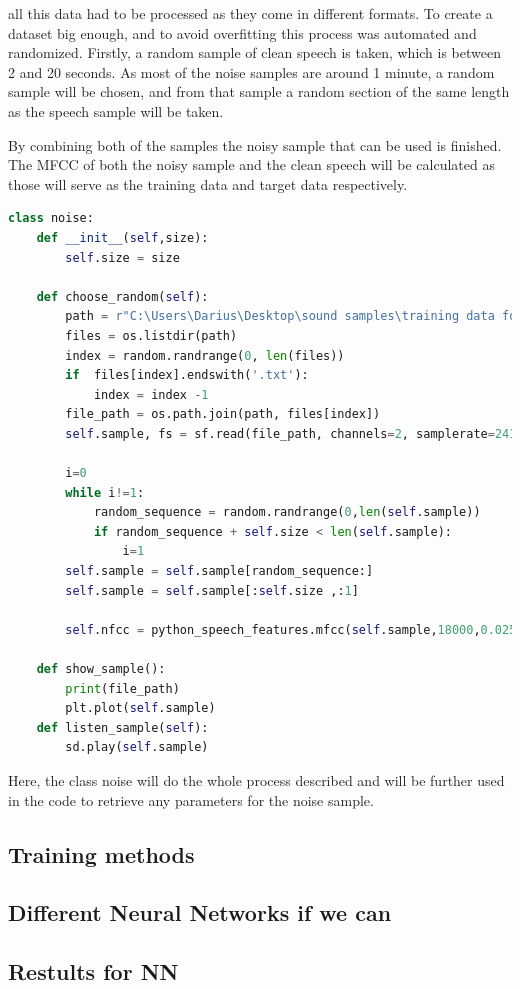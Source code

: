 all this data had to be processed as they come in different formats.
To create a dataset big enough, and to avoid overfitting this process was automated and randomized. Firstly, a random sample of clean speech is taken, which is between 2 and 20 seconds. As most of the noise samples are around 1 minute, a random sample will be chosen, and from that sample a random section of the same length as the speech sample will be taken.

By combining both of the samples the noisy sample that can be used is finished.
The MFCC of both the noisy sample and the clean speech will be calculated as those will serve as the training data and target data respectively.

\begin{lstlisting}[language=Python, caption=Noise sample gathering class]
class noise:
    def __init__(self,size):
        self.size = size
    
    def choose_random(self):
        path = r"C:\Users\Darius\Desktop\sound samples\training data for RNN\rnnoise_contributions"
        files = os.listdir(path)
        index = random.randrange(0, len(files))
        if  files[index].endswith('.txt'):
            index = index -1
        file_path = os.path.join(path, files[index])
        self.sample, fs = sf.read(file_path, channels=2, samplerate=24100,format='RAW', subtype='PCM_16')

        i=0
        while i!=1:
            random_sequence = random.randrange(0,len(self.sample))
            if random_sequence + self.size < len(self.sample):
                i=1
        self.sample = self.sample[random_sequence:]
        self.sample = self.sample[:self.size ,:1]
        
        self.nfcc = python_speech_features.mfcc(self.sample,18000,0.025,0.01,24)
        
    def show_sample():
        print(file_path)
        plt.plot(self.sample)
    def listen_sample(self):
        sd.play(self.sample) 

\end{lstlisting}

Here, the class noise will do the whole process described and will be further used in the code to retrieve any parameters for the noise sample.

\subsection{Training methods}

\subsection{Different Neural Networks if we can}

\subsection{Restults for NN}




